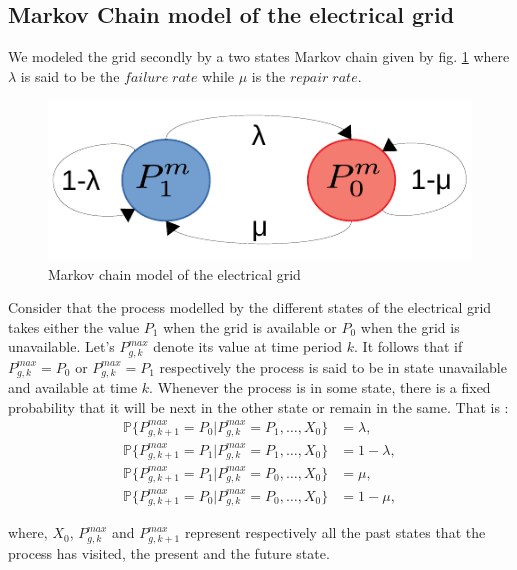 \documentclass{ifacconf}
\begin{document}
\subsection{Markov Chain model of the electrical grid }
 We modeled the grid secondly by a two states Markov chain given by fig. \ref{fig:MarChain} where $\lambda$ is said to be the $failure \; rate$ while $\mu$ is the $repair\; rate$.
 \begin{figure}[!ht]
        \begin{center}
                \includegraphics[width=0.60\columnwidth]{Figures/MarChain_paper.pdf}
        \end{center}
        \caption{Markov chain model of the electrical grid}
        \label{fig:MarChain}
\end{figure}
Consider that the process modelled by the different states of the electrical grid takes either the value $P_1$ when the grid is available or $P_0$ when the grid is unavailable. Let's $P^{max}_{g,k}$ denote its value at time period $k$. It follows that if $P_{g,k}^{max} = P_0$ or $P_{g,k}^{max} = P_1$ respectively the process is said to be in state unavailable and available at time $k$. Whenever the process is in some state, there is a fixed probability that it will be next in the other state or remain in the same. That is : 
\begin{subequations}\label{eq:MarChain}
\begin{align}
    \mathbb{P} \lbrace P^{max}_{g,k+1} =  P_0 | P^{max}_{g,k} = P_1, \ldots, X_0 \rbrace  &= \lambda, \\
    \mathbb{P} \lbrace P^{max}_{g,k+1} =  P_1 | P^{max}_{g,k} = P_1, \ldots, X_0 \rbrace  &= 1-\lambda, \\
    \mathbb{P} \lbrace P^{max}_{g,k+1} =  P_1 | P^{max}_{g,k} = P_0, \ldots, X_0 \rbrace  &= \mu, \\
    \mathbb{P} \lbrace P^{max}_{g,k+1} =  P_0 | P^{max}_{g,k } = P_0, \ldots, X_0 \rbrace  &= 1-\mu,
\end{align}
\end{subequations}

where, $X_0$, $P^{max}_{g,k}$ and $P^{max}_{g,k+1}$ represent respectively all the past states that the process has visited, the present and the future state. 
\end{document}
